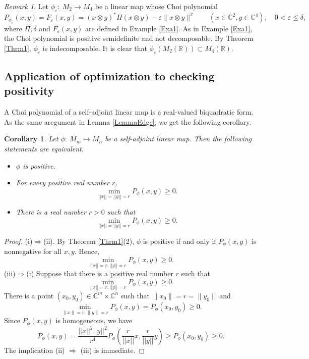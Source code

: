 \documentclass[12pt,a4paper]{amsart}
\theoremstyle{plain}
\newtheorem{corollary}[theorem]{Corollary}
\theoremstyle{remark}
\newtheorem{remark}{Remark}
\theoremstyle{definition}
\def \R {\mathbb{R}}
\def \C {\mathbb{C}}
\begin{document}
\begin{remark}
 Let $\phi_{\varepsilon}:\ M_2 \longrightarrow M_4$ be a linear map whose Choi polynomial 
 $$
 P_{\phi_{\varepsilon}}(x,y) = F_{\varepsilon}(x,y) = (x\otimes y)^* \Pi (x\otimes y) -\varepsilon \|x\otimes y\|^2 \qquad (x\in \C^2, y\in \C^4), \quad   0<\varepsilon \le \delta,
 $$
 where $\Pi, \delta$ and $F_{\varepsilon}(x,y)$ are defined in Example \ref{Exa1}. As in Example \ref{Exa1}, the Choi polynomial is positive semidefinite and not decomposable. By Theorem \ref{Thrm1}, $\phi_{\varepsilon}$ is indecomposable. 
 It is clear that $\phi_{\varepsilon} (M_2(\R)) \subset M_4(\R).$
 \end{remark}


\subsection{Application of optimization to checking positivity}
A Choi polynomial of a self-adjoint linear map is a real-valued  biquadratic form. As the same aregument in Lemma \ref{LemmaEdge}, we get the following corollary.
\begin{corollary}%
	Let $\phi :\ M_m \longrightarrow M_n $ be a self-adjoint linear map. Then the following statements are equivalent. 
	\begin{itemize}
		\item[(i)]  $\phi$ is positive.
		\item[(ii)]  For every positive real number $r$,
		$$\min_{||x||=||y||=r} P_{\phi}({x},y) \ge 0. $$
		\item[(iii)] There is a real number $r>0$ such that 
		$$\min_{||x||=||y||=r} P_{\phi}({x},y) \ge 0. $$
	\end{itemize}
\end{corollary}
\begin{proof} 	(i)$\Rightarrow$(ii).  By Theorem \ref{Thrm1}(2), $\phi$ is positive if and only if $P_{\phi}(x,y)$ is nonnegative for all $x,y.$ Hence,
	$$\min_{||x||=r, ||y||=r} P_{\phi}({x},y) \ge 0. $$
	(iii)$\Rightarrow$(i)
	Suppose that there is a positive real number $r$ such that $$\min_{||x||=r, ||y||=r} P_{\phi}({x},y) \ge 0. $$ 
	There is a point $(x_0,y_0) \in \C^m\times \C^n$ such that $\| x_0\| =r=\| y_0\|$ and 
	$$\min_{\|x\|=r, \|y\|=r} P_{\phi}(x,y) = P_{\phi}(x_0,y_0)\ge 0. $$
	Since $P_{\phi}(x,y)$ is homogeneous, we have
	$$P_{\phi}(x,y) = \frac{||x||^2 ||y||^2}{r^4} P_{\phi}(\frac{r}{||x||} x, \frac{r}{||y||} y) \ge P_{\phi}(x_0,y_0) \ge 0.$$ 
	The implication (ii) $\Rightarrow$ (iii) is immediate.
\end{proof}
\end{document}
